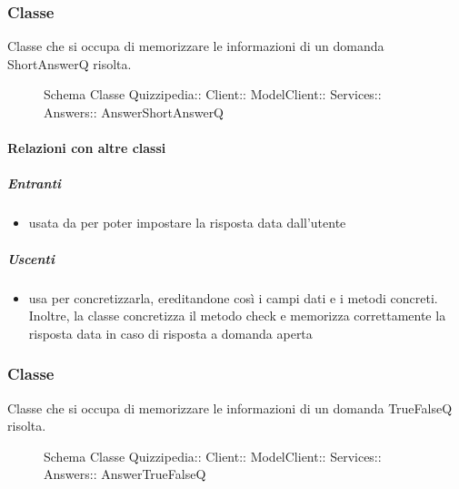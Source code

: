 \subsubsection{Classe }
Classe che si occupa di memorizzare le informazioni di un domanda ShortAnswerQ risolta.
\begin{figure}[H]
\centering
\noindent{}
\caption[Schema Classe AnswerShortAnswerQ]{Schema Classe Quizzipedia:: Client:: ModelClient:: Services:: Answers:: AnswerShortAnswerQ}
\end{figure}
\paragraph{Relazioni con altre classi}
\subparagraph{Entranti}
\begin{itemize}
\item usata da  per poter impostare la risposta data dall'utente
\end{itemize}
\subparagraph{Uscenti}
\begin{itemize}
\item usa  per concretizzarla, ereditandone così i campi dati e i metodi concreti. Inoltre, la classe concretizza il metodo check e memorizza correttamente la risposta data in caso di risposta a domanda aperta
\end{itemize}
\subsubsection{Classe }
Classe che si occupa di memorizzare le informazioni di un domanda TrueFalseQ risolta.
\begin{figure}[H]
\centering
\noindent{}
\caption[Schema Classe AnswerTrueFalseQ]{Schema Classe Quizzipedia:: Client:: ModelClient:: Services:: Answers:: AnswerTrueFalseQ}
\end{figure}
